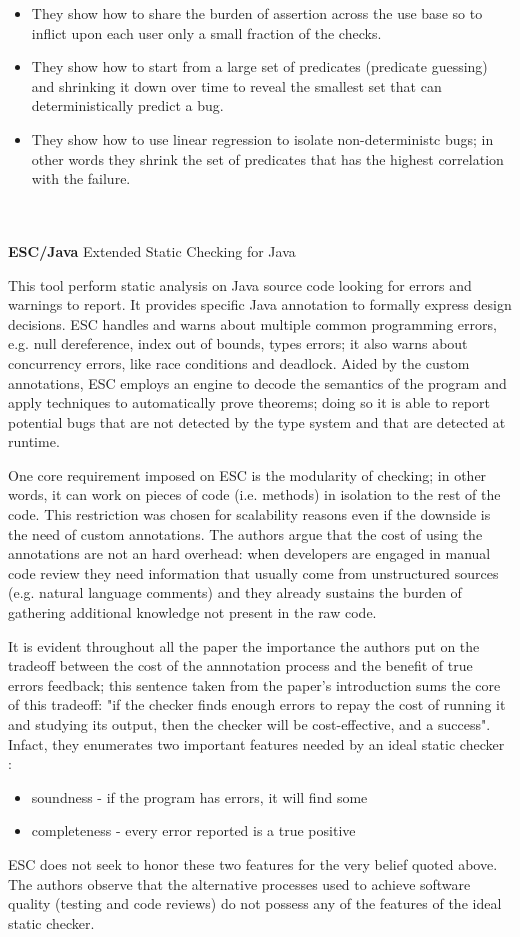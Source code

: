 \begin{itemize}
    \item They show how to share the burden of assertion across the use base so to inflict upon each user only a small fraction of the checks.
    \item They show how to start from a large set of predicates (predicate guessing) and shrinking it down over time to reveal the smallest set that can deterministically predict a bug.
    \item They show how to use linear regression to isolate non-deterministc bugs; in other words they shrink the set of predicates that has the highest correlation with the failure.
\end{itemize}
\\
\\
\textbf{ESC/Java} \cite{flanagan2002extended} Extended Static Checking for Java

This tool perform static analysis on Java source code looking for errors and warnings to report. It provides specific Java annotation to formally express design decisions. 
ESC handles and warns about multiple common programming errors, e.g. null dereference, index out of bounds, types errors; it also warns about concurrency errors, like race conditions and deadlock.
Aided by the custom annotations, ESC employs an engine to decode the semantics of the program and apply techniques to automatically prove theorems; doing so it is able to report potential bugs that are not detected by the type system and that are detected at runtime.


One core requirement imposed on ESC is the modularity of checking; in other words, it can work on pieces of code (i.e. methods) in isolation to the rest of the code. This restriction was chosen for scalability reasons even if the downside is the need of custom annotations.
The authors argue that the cost of using the annotations are not an hard overhead: when developers are engaged in manual code review they need information that usually come from unstructured sources (e.g. natural language comments) and they already sustains the burden of gathering additional knowledge not present in the raw code.

It is evident throughout all the paper the importance the authors put on the tradeoff between the cost of the annnotation process and the benefit of true errors feedback; this sentence taken from the paper's introduction sums the core of this tradeoff: "if the checker finds enough errors to repay the cost of running it and studying its output, then the checker will be cost-effective, and a success".
Infact, they enumerates two important features needed by an ideal static checker : 
\begin{itemize}
    \item soundness - if the program has errors, it will find some
    \item completeness - every error reported is a true positive
\end{itemize}
ESC does not seek to honor these two features for the very belief quoted above. The authors observe that the alternative processes used to achieve software quality (testing and code reviews) do not possess any of the features of the ideal static checker.

